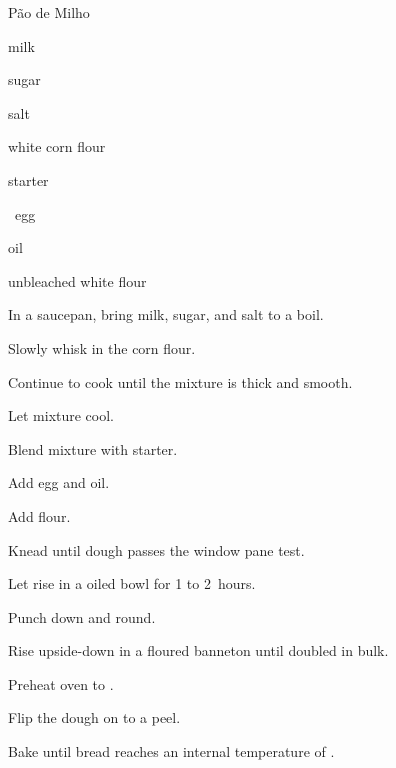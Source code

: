 \begin{recipe}{P\~ao de Milho}{}{}

\begin{ingredients}
\item {} milk
\item \C{\quarter} sugar
\item {} salt
\item {} white corn flour
\item {} starter
\item \half{}~egg
\item {} oil
\item {} unbleached white flour
\end{ingredients}

\begin{directions}
\item In a saucepan, bring milk, sugar, and salt to a boil.
\item Slowly whisk in the corn flour.
\item Continue to cook until the mixture is thick and smooth.
\item Let mixture cool.
\item Blend mixture with starter.
\item Add egg and oil.
\item Add flour.
\item Knead until dough passes the window pane test.
\item Let rise in a oiled bowl for 1 to 2~hours.
\item Punch down and round.
\item Rise upside-down in a floured banneton until doubled in bulk.
\item Preheat oven to .
\item Flip the dough on to a peel.
\item Bake until bread reaches an internal temperature of .
\end{directions}

\end{recipe}
